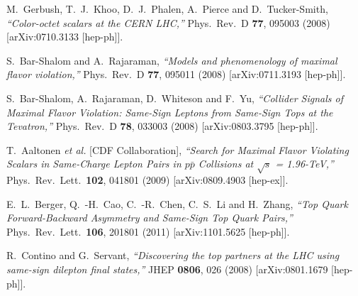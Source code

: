 \begin{thebibliography}{99}
  M.~Gerbush, T.~J.~Khoo, D.~J.~Phalen, A.~Pierce and D.~Tucker-Smith,
  {\it ``Color-octet scalars at the CERN LHC,''}
  Phys.\ Rev.\ D {\bf 77}, 095003 (2008)
  [arXiv:0710.3133 [hep-ph]].




  S.~Bar-Shalom and A.~Rajaraman,
  {\it ``Models and phenomenology of maximal flavor violation,''}
  Phys.\ Rev.\ D {\bf 77}, 095011 (2008)
  [arXiv:0711.3193 [hep-ph]].

  S.~Bar-Shalom, A.~Rajaraman, D.~Whiteson and F.~Yu,
  {\it ``Collider Signals of Maximal Flavor Violation: 
	Same-Sign Leptons from Same-Sign Tops at the Tevatron,''}
  Phys.\ Rev.\ D {\bf 78}, 033003 (2008)
  [arXiv:0803.3795 [hep-ph]].

  T.~Aaltonen {\it et al.}  [CDF Collaboration],
  {\it ``Search for Maximal Flavor Violating Scalars in 
	Same-Charge Lepton Pairs in $p \bar{p}$ Collisions at $\sqrt{s}$ = 1.96-TeV,''}
  Phys.\ Rev.\ Lett.\  {\bf 102}, 041801 (2009)
  [arXiv:0809.4903 [hep-ex]].





  E.~L.~Berger, Q.~-H.~Cao, C.~-R.~Chen, C.~S.~Li and H.~Zhang,
  {\it ``Top Quark Forward-Backward Asymmetry and Same-Sign Top Quark Pairs,''}
  Phys.\ Rev.\ Lett.\  {\bf 106}, 201801 (2011)
  [arXiv:1101.5625 [hep-ph]].


  R.~Contino and G.~Servant,
  {\it ``Discovering the top partners at the LHC using same-sign dilepton final states,''}
  JHEP {\bf 0806}, 026 (2008)
  [arXiv:0801.1679 [hep-ph]].



\end{thebibliography}
